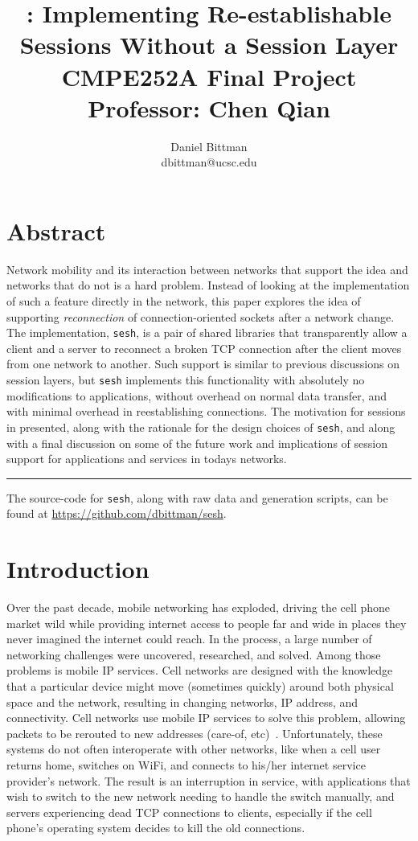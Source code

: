\documentclass[twocolumn,11pt]{article}
\author{Daniel Bittman \\ dbittman@ucsc.edu}
\title{\sesh: \textbf{Implementing Re-establishable\\Sessions Without a Session Layer}
\\
{\vspace{5mm}\normalsize CMPE252A Final Project\\\vspace{-3mm} Professor: Chen Qian}
}
\newcommand{\sesh}{\texttt{sesh}\xspace}
\begin{document}
\biolinum
\maketitle
\libertine
\renewcommand\ttdefault{lmtt}

\section*{Abstract}

Network mobility and its interaction between networks that support the idea and
networks that do not is a hard problem. Instead of looking at the implementation
of such a feature directly in the network, this paper explores the idea of
supporting \textit{reconnection} of connection-oriented sockets after a network
change. The implementation, \sesh, is a pair of shared libraries that
transparently allow a client and a server to reconnect a broken TCP connection
after the client moves from one network to another. Such support is similar to
previous discussions on session layers, but \sesh implements this functionality
with absolutely no modifications to applications, without overhead on normal
data transfer, and with minimal overhead in reestablishing connections. The
motivation for sessions in presented, along with the rationale for the design
choices of \sesh, and along with a final discussion on some of the future work
and implications of session support for applications and services in todays
networks.

\begin{center}\noindent\rule{2cm}{0.4pt}\end{center}

The source-code for \sesh, along with raw data and generation scripts,
can be found at \url{https://github.com/dbittman/sesh}.

\section{Introduction}

Over the past decade, mobile networking has exploded, driving the cell phone
market wild while providing internet access to people far and wide in places
they never imagined the internet could reach. In the process, a large number of
networking challenges were uncovered, researched, and solved. Among those
problems is mobile IP services. Cell networks are designed with the knowledge
that a particular device might move (sometimes quickly) around both physical
space and the network, resulting in changing networks, IP address, and
connectivity. Cell networks use mobile IP services to solve this problem,
allowing packets to be rerouted to new addresses (care-of,
etc)~\cite{Kurose,mobileip}. Unfortunately, these systems do not often interoperate
with other networks, like when a cell user returns home, switches on WiFi, and
connects to his/her internet service provider's network. The result is an
interruption in service, with applications that wish to switch to the new
network needing to handle the switch manually, and servers experiencing dead TCP
connections to clients, especially if the cell phone's operating system decides
to kill the old connections.
\end{document}
